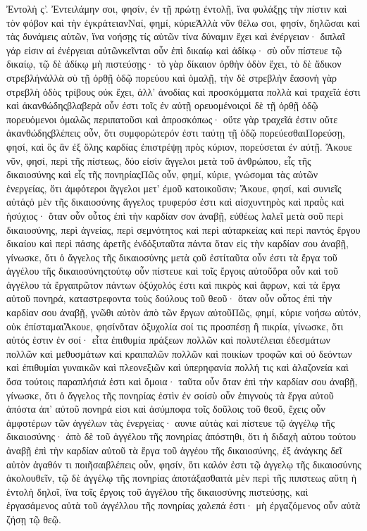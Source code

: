 Ἐντολὴ ς’.
Ἐντειλάμην σοι, φησίν, ἐν τῇ πρώτῃ ἐντολῇ, ἵνα φυλάξῃς τὴν πίστιν καὶ τὸν φόβον καὶ τὴν ἐγκράτειανΝαί, φημί, κύριεἈλλὰ νῦν θέλω σοι, φησίν, δηλῶσαι καὶ τὰς δυνάμεις αὐτῶν, ἵνα νοήσῃς τίς αὐτῶν τίνα δύναμιν ἔχει καὶ ἐνέργειαν· διπλαῖ γάρ εἰσιν αἱ ἐνέργειαι αὐτῶνκεῖνται οὖν ἐπὶ δικαίῳ καὶ ἀδίκῳ· σὺ οὖν πίστευε τῷ δικαίῳ, τῷ δὲ ἀδίκῳ μὴ πιστεύσῃς· τὸ γὰρ δίκαιον ὀρθὴν ὁδὸν ἔχει, τὸ δὲ ἄδικον στρεβλήνἀλλὰ σὺ τῇ ὀρθῇ ὁδῷ πορεύου καὶ ὁμαλῇ, τὴν δὲ στρεβλὴν ἔασονἡ γὰρ στρεβλὴ ὁδὸς τρίβους οὐκ ἔχει, ἀλλ’ ἀνοδίας καὶ προσκόμματα πολλὰ καὶ τραχεῖά ἐστι καὶ ἀκανθώδηςβλαβερὰ οὖν ἐστι τοῖς ἐν αὐτῇ ορευομένοιςοἱ δὲ τῇ ὀρθῇ ὁδῷ πορευόμενοι ὁμαλῶς περιπατοῦσι καὶ ἀπροσκόπως· οὔτε γὰρ τραχεῖά ἐστιν οὔτε ἀκανθώδηςβλέπεις οὖν, ὅτι συμφορώτερόν ἐστι ταύτῃ τῇ ὁδῷ πορεύεσθαιΠορεύσῃ, φησί, καὶ ὃς ἂν ἐξ ὅλης καρδίας ἐπιστρέψῃ πρὸς κύριον, πορεύσεται ἐν αὐτῇ.
Ἄκουε νῦν, φησί, περὶ τῆς πίστεως, δύο εἰσὶν ἄγγελοι μετὰ τοῦ ἀνθρώπου, εἷς τῆς δικαιοσύνης καὶ εἷς τῆς πονηρίαςΠῶς οὖν, φημί, κύριε, γνώσομαι τὰς αὐτῶν ἐνεργείας, ὅτι ἀμφότεροι ἄγγελοι μετ’ ἐμοῦ κατοικοῦσιν; Ἄκουε, φησί, καὶ συνιεῖς αὐτάςὁ μὲν τῆς δικαιοσύνης ἄγγελος τρυφερόσ ἐστι καὶ αἰσχυντηρὸς καὶ πραῢς καὶ ἡσύχιος· ὅταν οὖν οὗτος ἐπὶ τὴν καρδίαν σον ἀναβῇ, εὐθέως λαλεῖ μετὰ σοῦ περὶ δικαιοσύνης, περὶ ἁγνείας, περὶ σεμνότητος καὶ περὶ αὐταρκείας καὶ περὶ παντός ἔργου δικαίου καὶ περὶ πάσης ἀρετῆς ἐνδόξυταῦτα πάντα ὅταν εἰς τὴν καρδίαν σου ἀναβῇ, γίνωσκε, ὅτι ὁ ἄγγελος τῆς δικαιοσύνης μετὰ ςοῦ ἐστίταῦτα οὖν ἐστι τὰ ἔργα τοῦ ἀγγέλου τῆς δικαιοσύνηςτούτῳ οὖν πίστευε καὶ τοῖς ἔργοις αὐτοῦὅρα οὖν καὶ τοῦ ἀγγέλου τὰ ἔργαπρῶτον πάντων ὀξύχολός ἐστι καὶ πικρὸς καὶ ἄφρων, καὶ τὰ ἔργα αὐτοῦ πονηρά, καταστρεφοντα τοὺς δούλους τοῦ θεοῦ· ὅταν οὖν οὗτος ἐπὶ τὴν καρδίαν σου ἀναβῇ, γνῶθι αὐτὸν ἀπὸ τῶν ἔργων αὐτοῦΠῶς, φημί, κύριε νοήσω αὐτόν, οὐκ ἐπίσταμαιἌκουε, φησίνὅταν ὀξυχολία σοί τις προσπέσῃ ἢ πικρία, γίνωσκε, ὅτι αὐτός ἐστιν ἐν σοί· εἶτα ἐπιθυμία πράξεων πολλῶν καὶ πολυτέλειαι ἐδεσμάτων πολλῶν καὶ μεθυσμάτων καὶ κραιπαλῶν πολλῶν καὶ ποικίων τροφῶν καὶ οὐ δεόντων καὶ ἐπιθυμίαι γυναικῶν καὶ πλεονεξιῶν καὶ ὑπερηφανία πολλή τις καὶ ἀλαζονεία καὶ ὅσα τούτοις παραπλήσιά ἐστι καὶ ὅμοια· ταῦτα οὖν ὅταν ἐπὶ τὴν καρδίαν σου ἀναβῇ, γίνωσκε, ὅτι ὁ ἄγγελος τῆς πονηρίας ἐστὶν ἐν σοίσὺ οὖν ἐπιγνοὺς τὰ ἔργα αὐτοῦ ἀπόστα ἀπ’ αὐτοῦ πονηρά εἰσι καὶ ἀσύμποφα τοῖς δοῦλοις τοῦ θεοῦ, ἔχεις οὖν ἀμφοτέρων τῶν ἀγγέλων τὰς ἐνεργείας· αυνιε αὐτὰς καὶ πίστευε τῷ ἀγγέλῳ τῆς δικαιοσύνης· ἀπὸ δὲ τοῦ ἀγγέλου τῆς πονηρίας ἀπόστηθι, ὅτι ἡ διδαχὴ αὐτου τούτου ἀναβῇ ἐπὶ τὴν καρδίαν αὐτοῦ τὰ ἔργα τοῦ ἀγγέου τῆς δικαιοσύνης, ἐξ ἀνάγκης δεῖ αὐτὸν ἀγαθόν τι ποιῆσαιβλέπεις οὖν, φησίν, ὅτι καλόν ἐστι τῷ ἀγγελῳ τῆς δικαιοσύνης ἀκολουθεῖν, τῷ δὲ ἀγγέλῳ τῆς πονηρίας ἀποτάξασθαιτὰ μὲν περὶ τῆς πιπστεως αὕτη ἡ ἐντολὴ δηλοῖ, ἵνα τοῖς ἔργοις τοῦ ἀγγέλου τῆς δικαιοσύνης πιστεύσῃς, καὶ ἐργασάμενος αὐτὰ τοῦ ἀγγέλλου τῆς πονηρίας χαλεπά ἐστι· μὴ ἐργαζόμενος οὖν αὐτὰ ζήσῃ τῷ θεῷ.

